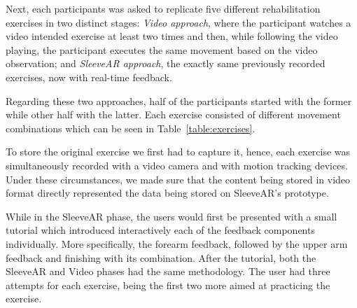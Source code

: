 Next, each participants was asked to replicate five different rehabilitation exercises in two distinct stages:
{\it Video approach}, where the participant watches a video intended exercise at least two times and then, while following the video playing, the participant executes the same movement based on the video observation; and {\it SleeveAR approach}, the exactly same previously recorded exercises, now with real-time feedback.

Regarding these two approaches, half of the participants started with the former while other half with the latter.
Each exercise consisted of different movement combinations which can be seen in Table~\ref{table:exercises}.

To store the original exercise we first had to capture it, hence, each exercise was simultaneously recorded with a video camera and with motion tracking devices. Under these circumstances, we made sure that the content being stored in video format directly represented the data being stored on SleeveAR's prototype.

While in the SleeveAR phase, the users would first be presented with a small tutorial which introduced interactively each of the feedback components individually. 
More specifically, the forearm feedback, followed by the upper arm feedback and finishing with its combination.
After the tutorial, both the SleeveAR and Video phases had the same methodology. 
The user had three attempts for each exercise, being the first two more aimed at practicing the exercise.

\begin{table}[!t]
\centering
{}
\caption{Arm movements in exercises.}
\label{table:exercises}
\end{table}


